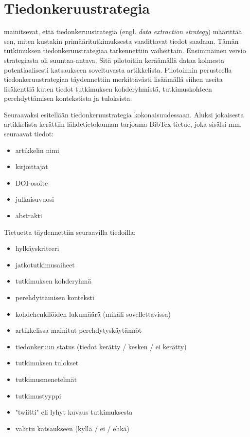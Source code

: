 \documentclass[utf8]{gradu3}
\begin{document}
\section{Tiedonkeruustrategia}
\label{luku-tiedonkeruustrategia}

\textcite{kitchenham-charters-2007} mainitsevat, että tiedonkeruustrategia (engl. \textit{data extraction strategy}) määrittää sen, miten kustakin primääritutkimuksesta vaadittavat tiedot saadaan. Tämän tutkimuksen tiedonkeruustrategiaa tarkennettiin vaiheittain. Ensimmäinen versio strategiasta oli suuntaa-antava. Sitä pilotoitiin keräämällä dataa kolmesta potentiaalisesti katsaukseen soveltuvasta artikkelista. Pilotoinnin perusteella tiedonkeruustrategiaa täydennettiin merkittävästi lisäämällä siihen useita lisäkenttiä kuten tiedot tutkimuksen kohderyhmistä, tutkimuskohteen perehdyttämisen kontekstista ja tuloksista.

Seuraavaksi esitellään tiedonkeruustrategia kokonaisuudessaan. Aluksi jokaisesta artikkelista kerättiin lähdetietokannan tarjoama BibTex-tietue, joka sisälsi mm. seuraavat tiedot:

\begin{itemize}
    \item artikkelin nimi
    \item kirjoittajat
    \item DOI-osoite
    \item julkaisuvuosi
    \item abstrakti
\end{itemize}

Tietuetta täydennettiin seuraavilla tiedoilla:

\begin{itemize}
    \item hylkäyskriteeri
    \item jatkotutkimusaiheet
    \item tutkimuksen kohderyhmä
    \item perehdyttämisen konteksti
    \item kohdehenkilöiden lukumäärä (mikäli sovellettavissa)
    \item artikkelissa mainitut perehdytyskäytännöt
    \item tiedonkeruun status (tiedot kerätty / kesken / ei kerätty)
    \item tutkimuksen tulokset
    \item tutkimusmenetelmät
    \item tutkimustyyppi
    \item "twiitti" eli lyhyt kuvaus tutkimuksesta
    \item valittu katsaukseen (kyllä / ei / ehkä)
\end{itemize}
\end{document}
